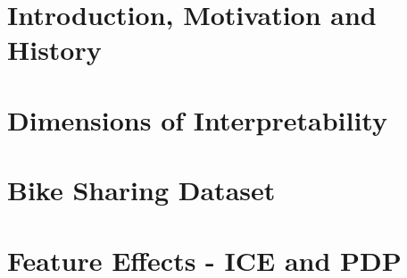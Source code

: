 \documentclass[11pt,compress,t,notes=noshow, aspectratio=169, xcolor=table]{beamer}
\begin{document}


\section{Introduction, Motivation and History}




\section{Dimensions of Interpretability}




%

% 

\section{Bike Sharing Dataset}


\section{Feature Effects - ICE and PDP}


\end{document}
